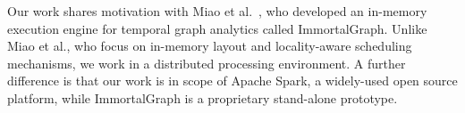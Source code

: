 Our work shares motivation with Miao et
al.~\cite{DBLP:journals/tos/MiaoHLWYZPCC15}, who developed an
in-memory execution engine for temporal graph analytics called
ImmortalGraph.  Unlike Miao et al., who focus on in-memory layout and
locality-aware scheduling mechanisms, we work in a distributed
processing environment.  A further difference is that our work is in
scope of Apache Spark, a widely-used open source platform, while
ImmortalGraph is a proprietary stand-alone prototype.
